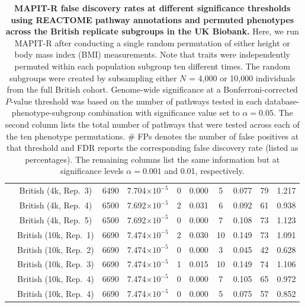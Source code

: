 \documentclass[10pt]{article}
\begin{document}
\begin{landscape}
\begin{table}[ht]
\begin{tabular}{|c|c|c|ccc|cc|cc|}
  & British (4k, Rep.~3) & 6490 & 7.704$\times 10^{-5}$ & 0 & 0.000 & 5 & 0.077 & 79 & 1.217 \\
  & British (4k, Rep.~4) & 6500 & 7.692$\times 10^{-5}$ & 2 & 0.031 & 6 & 0.092 & 61 & 0.938 \\
  & British (4k, Rep.~5) & 6500 & 7.692$\times 10^{-5}$ & 0 & 0.000 & 7 & 0.108 & 73 & 1.123 \\
  & British (10k, Rep.~1) & 6690 & 7.474$\times 10^{-5}$ & 2 & 0.030 & 10 & 0.149 & 73 & 1.091 \\
  & British (10k, Rep.~2) & 6690 & 7.474$\times 10^{-5}$ & 0 & 0.000 & 3 & 0.045 & 42 & 0.628 \\
  & British (10k, Rep.~3) & 6690 & 7.474$\times 10^{-5}$ & 1 & 0.015 & 10 & 0.149 & 74 & 1.106 \\
  & British (10k, Rep.~4) & 6690 & 7.474$\times 10^{-5}$ & 0 & 0.000 & 7 & 0.105 & 65 & 0.972 \\
  & British (10k, Rep.~4) & 6690 & 7.474$\times 10^{-5}$ & 0 & 0.000 & 5 & 0.075 & 57 & 0.852 \\
    \hline
\end{tabular}
\caption{\textbf{MAPIT-R false discovery rates at different significance thresholds using REACTOME pathway annotations and permuted phenotypes across the British replicate subgroups in the UK Biobank.} Here, we run MAPIT-R after conducting a single random permutation of either height or body mass index (BMI) measurements. Note that traits were independently permuted within each population subgroup ten different times. The random subgroups were created by subsampling either $N$ = 4,000 or 10,000 individuals from the full British cohort. Genome-wide significance at a Bonferroni-corrected $P$-value threshold was based on the number of pathways tested in each database-phenotype-subgroup combination with significance value set to $\alpha = 0.05$. The second column lists the total number of pathways that were tested across each of the ten phenotype permutations. \# FPs denotes the number of false positives at that threshold and FDR reports the corresponding false discovery rate (listed as percentages). The remaining columns list the same information but at significance levels $\alpha = 0.001$ and 0.01, respectively.}
\label{InterPath-Supp-Table-BritReps-FDRs-pt2}
\end{table}

\end{landscape}
\end{document}
